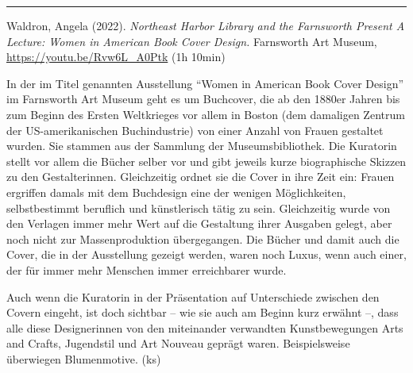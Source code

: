 \documentclass[a4paper,
fontsize=11pt,
oneside,
numbers=noperiodatend,
parskip=half-,
bibliography=totoc,
final
]{scrartcl}
\begin{document}
\begin{center}\rule{0.5\linewidth}{0.5pt}\end{center}

Waldron, Angela (2022). \emph{Northeast Harbor Library and the
Farnsworth Present A Lecture: Women in American Book Cover Design.}
Farnsworth Art Museum, \url{https://youtu.be/Rvw6L_A0Ptk} (1h 10min)

In der im Titel genannten Ausstellung \enquote{Women in American Book
Cover Design} im Farnsworth Art Museum geht es um Buchcover, die ab den
1880er Jahren bis zum Beginn des Ersten Weltkrieges vor allem in Boston
(dem damaligen Zentrum der US-amerikanischen Buchindustrie) von einer
Anzahl von Frauen gestaltet wurden. Sie stammen aus der Sammlung der
Museumsbibliothek. Die Kuratorin stellt vor allem die Bücher selber vor
und gibt jeweils kurze biographische Skizzen zu den Gestalterinnen.
Gleichzeitig ordnet sie die Cover in ihre Zeit ein: Frauen ergriffen
damals mit dem Buchdesign eine der wenigen Möglichkeiten, selbstbestimmt
beruflich und künstlerisch tätig zu sein. Gleichzeitig wurde von den
Verlagen immer mehr Wert auf die Gestaltung ihrer Ausgaben gelegt, aber
noch nicht zur Massenproduktion übergegangen. Die Bücher und damit auch
die Cover, die in der Ausstellung gezeigt werden, waren noch Luxus, wenn
auch einer, der für immer mehr Menschen immer erreichbarer wurde.

Auch wenn die Kuratorin in der Präsentation auf Unterschiede zwischen
den Covern eingeht, ist doch sichtbar -- wie sie auch am Beginn kurz
erwähnt --, dass alle diese Designerinnen von den miteinander verwandten
Kunstbewegungen Arts and Crafts, Jugendstil und Art Nouveau geprägt
waren. Beispielsweise überwiegen Blumenmotive. (ks)

\end{document}
